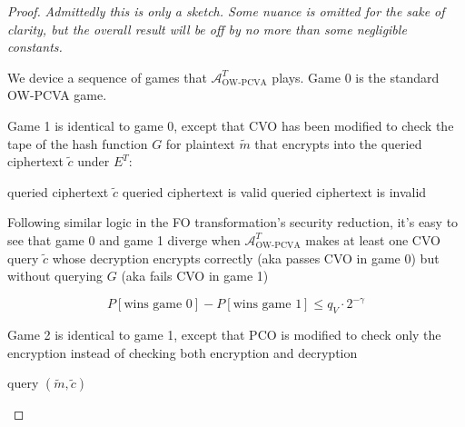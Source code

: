 \documentclass{article}
\begin{document}
\begin{proof}\label{cpa-to-pcva-proof}
    \textit{Admittedly this is only a sketch. Some nuance is omitted for the sake of clarity, but the overall result will be off by no more than some negligible constants.}

    We device a sequence of games that $\mathcal{A}^T_\text{OW-PCVA}$ plays. Game 0 is the standard OW-PCVA game.

    Game 1 is identical to game 0, except that CVO has been modified to check the tape of the hash function $G$ for plaintext $\tilde{m}$ that encrypts into the queried ciphertext $\tilde{c}$ under $E^T$:

    \begin{algorithm}\label{cvo-1}
        \caption{$\text{CVO}_1$}
        \begin{algorithmic}[1]
            \Require queried ciphertext $\tilde{c}$
                    \State {}  \Comment queried ciphertext is valid
                \EndIf
            \EndFor
            \State {}  \Comment queried ciphertext is invalid
        \end{algorithmic}
    \end{algorithm}

    Following similar logic in the FO transformation's security reduction, it's easy to see that game 0 and game 1 diverge when $\mathcal{A}^T_\text{OW-PCVA}$ makes at least one CVO query $\tilde{c}$ whose decryption encrypts correctly (aka passes CVO in game 0) but without querying $G$ (aka fails CVO in game 1)

    \begin{equation}
        P[\text{wins game 0}] - P[\text{wins game 1}] \leq q_V \cdot 2^{-\gamma}
    \end{equation}

    Game 2 is identical to game 1, except that PCO is modified to check only the encryption instead of checking both encryption and decryption

    \begin{algorithm}
        \caption{$\text{PCO}_2$}
        \begin{algorithmic}[1]
            \Require query $(\tilde{m}, \tilde{c})$
                    \State {}
                \EndIf
            \EndFor
            \State {}
        \end{algorithmic}
    \end{algorithm}\pagebreak


\end{proof}
\end{document}
